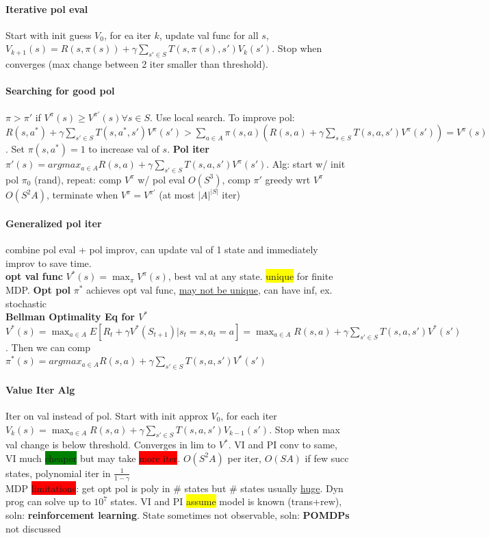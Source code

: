 \paragraph{Iterative pol eval} Start with init guess $V_0$, for ea
iter $k$, update val func for all $s$, $V_{k+1}(s)=R(s,\pi(s))+\gamma
\sum_{s' \in S}T(s,\pi(s),s')V_k(s')$. Stop when converges (max change
between 2 iter smaller than threshold).
\paragraph{Searching for good pol} $\pi > \pi'$ if $V^{\pi}(s)\geq
V^{\pi'}(s) \forall s \in S$. Use local search. To improve pol:
$R(s,a^*)+\gamma \sum_{s' \in S}T(s,a^*,s')V^{\pi}(s')>\sum_{a\in
  A}\pi(s,a)(R(s,a)+\gamma \sum_{s \in
  S}T(s,a,s')V^{\pi}(s'))=V^{\pi}(s)$. Set $\pi(s,a^*)=1$ to increase
val of $s$. \textbf{Pol iter} $\pi'(s)=argmax_{a\in A}R(s,a)+\gamma
\sum_{s'\in S}T(s,a,s')V^{\pi}(s')$. Alg: start w/ init pol $\pi_0$
(rand), repeat: comp $V^\pi$ w/ pol eval $O(S^3)$, comp $\pi'$ greedy wrt
$V^\pi$ $O(S^2A)$, terminate when $V^\pi = V^{\pi'}$ (at most
$|A|^{|S|}$ iter)
\paragraph{Generalized pol iter} combine pol eval + pol improv, can
update val of 1 state and immediately improv to save time.
\\ \textbf{opt val func} $V^*(s)=\max_{\pi}V^{\pi}(s)$, best val at
any state. \colorbox{yellow}{unique} for finite MDP. \textbf{Opt pol} $\pi^*$ achieves opt val func, \underline{may not be
unique}, can have inf, ex. stochastic
\\ \textbf{Bellman Optimality Eq for $V^*$} $V^*(s)=\max_{a\in
  A}E[R_t+\gamma V^*(S_{t+1})|s_t=s,a_t=a]=\max_{a \in A}R(s,a)+\gamma
\sum_{s' \in S}T(s,a,s')V^*(s')$. Then we can comp $\pi^*(s)=argmax_{a
\in A}R(s,a)+\gamma \sum_{s'\in S}T(s,a,s')V^*(s')$
\paragraph{Value Iter Alg} Iter on val instead of pol. Start with init
approx $V_0$, for each iter $V_k(s)=\max_{a\in A}R(s,a)+\gamma\sum_{s'
\in S}T(s,a,s')V_{k-1}(s')$. Stop when max val change is below
threshold. Converges in lim to $V^*$. VI and PI conv to same, VI much
\colorbox{green}{cheaper} but may take \colorbox{red}{more
  iter}. $O(S^2A)$ per iter, $O(SA)$ if few succ states, polynomial
iter in $\frac{1}{1-\gamma}$
\\MDP \colorbox{red}{limitations}: get opt pol is poly in \# states but
\# states usually \underline{huge}. Dyn prog can solve up to $10^7$
states. VI and PI \colorbox{yellow}{assume} model is known
(trans+rew), soln: \textbf{reinforcement learning}. State sometimes
not observable, soln: \textbf{POMDPs} not discussed

